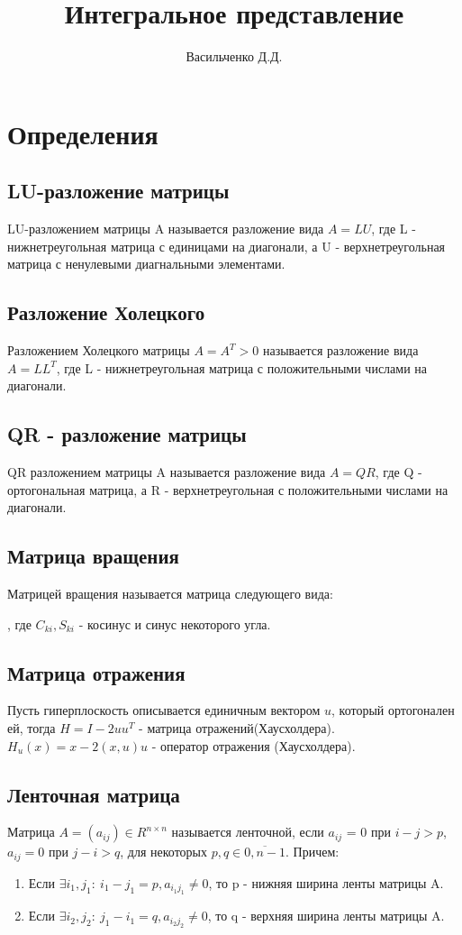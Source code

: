 \documentclass[9pt]{article}
\title{Интегральное представление}
\author{Васильченко Д.Д.}
\begin{document}
	\section{Определения}
	\subsection{LU-разложение матрицы}
		LU-разложением матрицы A называется разложение вида $A = LU$, где L - нижнетреугольная матрица с единицами на диагонали, а U - верхнетреугольная матрица с ненулевыми диагнальными элементами.
	\subsection{Разложение Холецкого}
		Разложением Холецкого матрицы $A = A^{T} > 0$ называется разложение вида $A = L L^T$, где L - нижнетреугольная матрица с положительными числами на диагонали.
	\subsection{QR - разложение матрицы}
	    QR разложением матрицы A называется разложение вида $A = QR$, где Q - ортогональная матрица, а R - верхнетреугольная с положительными числами на диагонали.
	\subsection{Матрица вращения}
		Матрицей вращения называется матрица следующего вида:
		\newline

	, где $C_{ki}, S_{ki}$ - косинус и синус некоторого угла.
	\subsection{Матрица отражения}
		Пусть гиперплоскость описывается единичным вектором $u$, который ортогонален ей, тогда $H = I- 2uu^T$ - матрица отражений(Хаусхолдера). $H_u(x) = x - 2(x,u)u$ - оператор отражения (Хаусхолдера).\newpage
	\subsection{Ленточная матрица}
	 	Матрица $A = (a_{ij}) \in R^{n\times n}$ называется ленточной, если $a_{ij}$ = 0 при $i-j>p$, $a_{ij} =0$ при $j-i>q$, для некоторых $p,q \in \overline{0, n-1}$.  Причем:
	 	\begin{enumerate}
	 		\item Если $\exists i_1, j_1: \ i_1 - j_1 = p, a_{i_1j_1} \neq 0$, то p - нижняя ширина ленты матрицы A.
	 		\item Если $\exists i_2, j_2: \ j_1 - i_1 = q, a_{i_2j_2} \neq 0$, то q - верхняя ширина ленты матрицы A.
	 	\end{enumerate}
\end{document}

